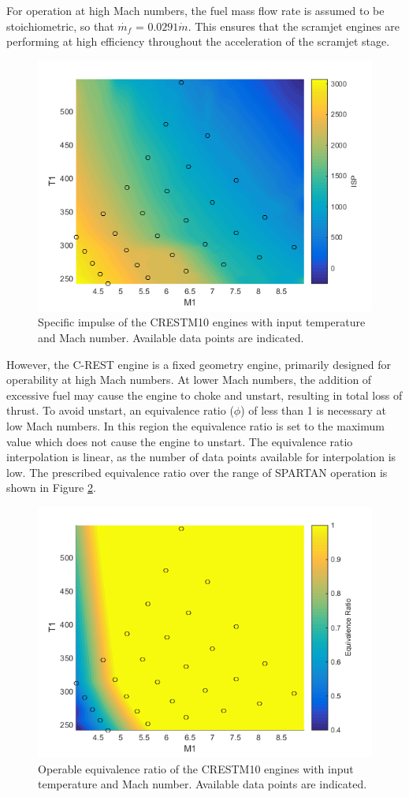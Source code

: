 For operation at high Mach numbers, the fuel mass flow rate is assumed to be stoichiometric, so that $\dot{m_f}$ = $0.0291\dot{m}$. This ensures that the scramjet engines are performing at high efficiency throughout the acceleration of the scramjet stage. 
\begin{figure}[ht]
	\centering
	\includegraphics[width=0.6\linewidth]{figures/3_vehicle_design/ISPinterp}
	\caption{Specific impulse of the CRESTM10 engines with input temperature and Mach number. Available data points are indicated.}
	\label{fig:ISPinterp}
\end{figure}
However, the C-REST engine is a fixed geometry engine, primarily designed for operability at high Mach numbers\cite{Preller2017b}. At lower Mach numbers, the addition of excessive fuel may cause the engine to choke and unstart, resulting in total loss of thrust\cite{Preller2017b}. To avoid unstart, an equivalence ratio ($\phi$) of less than 1 is necessary at low Mach numbers. In this region the equivalence ratio is set to the maximum value which does not cause the engine to unstart. The equivalence ratio interpolation is linear, as the number of data points available for interpolation is low. The prescribed equivalence ratio over the range of SPARTAN operation is shown in Figure \ref{fig:EquivalenceRatioInterp}.
\begin{figure}[ht]
	\centering
	\includegraphics[width=0.6\linewidth]{figures/3_vehicle_design/EquivalenceRatioInterp}
	\caption{Operable equivalence ratio of the CRESTM10 engines with input temperature and Mach number. Available data points are indicated.}
	\label{fig:EquivalenceRatioInterp}
\end{figure}
